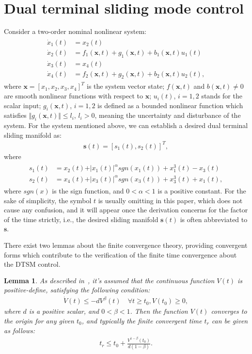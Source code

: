 \documentclass[3p]{elsarticle}
\theoremstyle{plain}
\newtheorem{mylem}{Lemma}
\theoremstyle{remark}
\begin{document}
\section{Dual terminal sliding mode control}\label{sec:2}
Consider a two-order nominal nonlinear system:
\begin{align}
\begin{split}
\dot x_1(t) &= x_2(t)\\
\dot x_2(t) &= f_1(\bm x,t)+g_1(\bm x,t)+b_1(\bm x,t)u_1(t)\\
\dot x_3(t) &= x_4(t)\\
\dot x_4(t) &= f_2(\bm x,t)+g_2(\bm x,t)+b_2(\bm x,t)u_2(t),\label{eq:two order system}
\end{split}
\end{align}
where $\bm x = [x_1,x_2,x_3,x_4]^T$ is the system vector state; $f(\bm x,t)$ and $b(\bm x,t)\neq 0$ are smooth nonlinear functions with respect to $\bm x$; $u_i(t)$, $i=1,2$ stands for the scalar input; $g_i(\bm x,t)$, $i=1,2$  is defined as a bounded nonlinear function which satisfies $\Vert g_i(\bm x,t)\Vert\le l_i$, $l_i>0$, meaning the uncertainty and disturbance of the system. For the system mentioned above, we can establish a desired dual terminal sliding manifold as:
\begin{align}
\bm s(t) = [s_1(t),s_2(t)]^T,
\end{align}
where
\begin{align}
\begin{split}
s_1(t) &= x_2(t)+\vert x_1(t)\vert^{\alpha} sgn(x_1(t))+x_1^3(t)-x_3(t)\\
s_2(t) &= x_4(t)+\vert x_3(t)\vert^{\alpha} sgn(x_3(t))+x_3^3(t)+x_1(t),\label{eq:dual sliding manifold}
\end{split}
\end{align}
where $sgn(x)$ is the sign function, and $0<\alpha<1$ is a positive constant. For the sake of simplicity, the symbol $t$ is usually omitting in this paper, which does not cause any confusion, and it will appear once the derivation concerns for the factor of the time strictly, i.e., the desired sliding manifold $\bm s(t)$ is often abbreviated to $\bm s$.\par
There exist two lemmas about the finite convergence theory, providing convergent forms which contribute to the verification of the finite time convergence about the DTSM control.
\begin{mylem}
As described in~\cite{moulay2006finite}, it's assumed that the continuous function $V(t)$ is positive-define, satisfying the following condition:
\begin{align}
\dot V(t)\le -dV^\beta(t)\quad\forall t\ge t_0, V(t_0)\ge 0,
\end{align}
where $d$ is a positive scalar, and $0<\beta<1$. Then the function $V(t)$ converges to the origin for any given $t_0$, and typically the finite convergent time $t_r$ can be given as follows:
\begin{align}
t_r \le t_0+\frac{V^{1-\beta}(t_0)}{d(1-\beta)}.
\end{align}\label{lemma:1}
\end{mylem}
\end{document}
